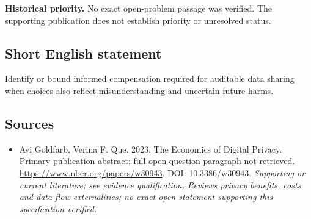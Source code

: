 \documentclass[11pt]{article}
\begin{document}
\par\textbf{Historical priority.} No exact open-problem passage was verified. The supporting publication does not establish priority or unresolved status.

\subsection{Short English statement}
Identify or bound informed compensation required for auditable data sharing when choices also reflect misunderstanding and uncertain future harms.

\subsection{Sources}
\begin{itemize}\raggedright
\item[\textnormal{[S1]}]\hypertarget{source:30007688:1}{} Avi Goldfarb, Verina F. Que. 2023. The Economics of Digital Privacy. Primary publication abstract; full open-question paragraph not retrieved.
\url{https://www.nber.org/papers/w30943}.
DOI: 10.3386/w30943.
{\small\textit{Supporting or current literature; see evidence qualification. Reviews privacy benefits, costs and data-flow externalities; no exact open statement supporting this specification verified.}}
\end{itemize}
\end{document}
